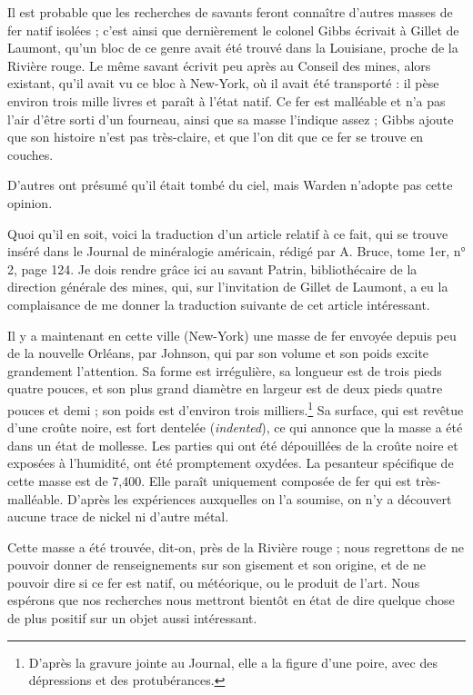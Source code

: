 \documentclass[a4paper, 12pt, oneside, french]{article}
\begin{document}
Il est probable que les recherches de savants feront connaître d'autres masses de fer natif isolées ; c'est ainsi que dernièrement le colonel Gibbs écrivait à Gillet de Laumont, qu'un bloc de ce genre avait été trouvé dans la Louisiane, proche de la Rivière rouge. Le même savant écrivit peu après au Conseil des mines, alors existant, qu'il avait vu ce bloc à New-York, où il avait été transporté : il pèse environ trois mille livres et paraît à l'état natif. Ce fer est malléable et n'a pas l'air d'être sorti d'un fourneau, ainsi que sa masse l'indique assez ; Gibbs ajoute que son histoire n'est pas très-claire, et que l'on dit que ce fer se trouve en couches.

D'autres ont présumé qu'il était tombé du ciel, mais Warden n'adopte pas cette opinion.

Quoi qu'il en soit, voici la traduction d'un article relatif à ce fait, qui se trouve inséré dans le Journal de minéralogie américain, rédigé par A. Bruce, tome 1er, n° 2, page 124. Je dois rendre grâce ici au savant Patrin, bibliothécaire de la direction générale des mines, qui, sur l'invitation de Gillet de Laumont, a eu la complaisance de me donner la traduction suivante de cet article intéressant.

\og Il y a maintenant en cette ville (New-York) une masse de fer envoyée depuis peu de la nouvelle Orléans, par Johnson, qui par son volume et son poids excite grandement l'attention. Sa forme est irrégulière, sa longueur est de trois pieds quatre pouces, et son plus grand diamètre en largeur est de deux pieds quatre pouces et demi ; son poids est d'environ trois milliers.\footnote{D'après la gravure jointe au Journal, elle a la figure d'une poire, avec des dépressions et des protubérances.} Sa surface, qui est revêtue d'une croûte noire, est fort dentelée (\emph{indented}), ce qui annonce que la masse a été dans un état de mollesse. Les parties qui ont été dépouillées de la croûte noire et exposées à l'humidité, ont été promptement oxydées. La pesanteur spécifique de cette masse est de 7,400. Elle paraît uniquement composée de fer qui est très-malléable. D'après les expériences auxquelles on l'a soumise, on n'y a découvert aucune trace de nickel ni d'autre métal. \fg

\og Cette masse a été trouvée, dit-on, près de la Rivière rouge ; nous regrettons de ne pouvoir donner de renseignements sur son gisement et son origine, et de ne pouvoir dire si ce fer est natif, ou météorique, ou le produit de l'art. Nous espérons que nos recherches nous mettront bientôt en état de dire quelque chose de plus positif sur un objet aussi intéressant. \fg
\end{document}
